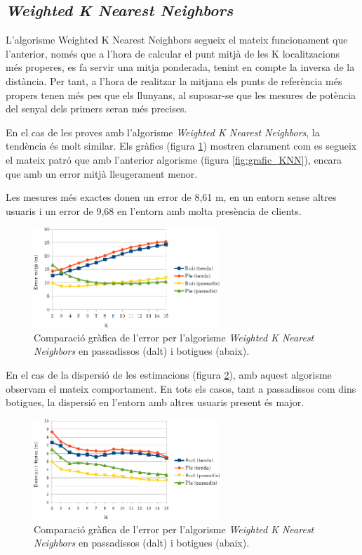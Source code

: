 \subsection{\textit{Weighted K Nearest Neighbors}}

L'algorisme Weighted K Nearest Neighbors segueix el mateix funcionament que l'anterior, només que a l'hora de calcular el punt mitjà de les K localitzacions més properes, es fa servir una mitja ponderada, tenint en compte la inversa de la distància. Per tant, a l'hora de realitzar la mitjana els punts de referència més propers tenen més pes que els llunyans, al suposar-se que les mesures de potència del senyal dels primers seran més precises.

En el cas de les proves amb l'algorisme \textit{Weighted K Nearest Neighbors}, la tendència és molt similar. Els gràfics (figura \ref{fig:grafic_mitja_WKNN}) mostren clarament com es segueix el mateix patró que amb l'anterior algorisme (figura \ref{fig:grafic_KNN}), encara que amb un error mitjà lleugerament menor.

Les mesures més exactes donen un error de 8,61 m, en un entorn sense altres usuaris i un error de 9,68 en l'entorn amb molta presència de clients.

\begin{figure}[ht]
\begin{center}
\includegraphics[width=7cm]{imatges/wknn_mitja.png}
\caption{Comparació gràfica de l'error per l'algorisme \textit{Weighted K Nearest Neighbors} en passadissos (dalt) i botigues (abaix).}
\label{fig:grafic_mitja_WKNN}
\end{center}
\end{figure}

En el cas de la dispersió de les estimacions (figura \ref{fig:grafic_desviacio_WKNN}), amb aquest algorisme observam el mateix comportament. En tots els casos, tant a passadissos com dins botigues, la dispersió en l'entorn amb altres usuaris present és major. 

\begin{figure}[ht]
\begin{center}
\includegraphics[width=7cm]{imatges/wknn_desviacio.png}
\caption{Comparació gràfica de l'error per l'algorisme \textit{Weighted K Nearest Neighbors} en passadissos (dalt) i botigues (abaix).}
\label{fig:grafic_desviacio_WKNN}
\end{center}
\end{figure}

